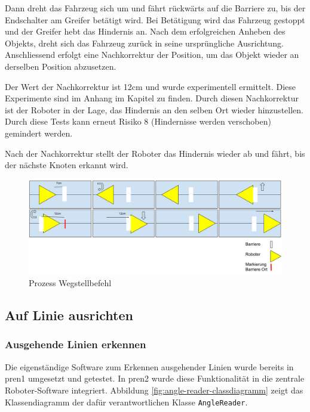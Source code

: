 Dann dreht das Fahrzeug sich um und fährt rückwärts auf die Barriere zu, bis der Endschalter am Greifer betätigt wird. Bei Betätigung wird das Fahrzeug gestoppt und der Greifer hebt das Hindernis an.
Nach dem erfolgreichen Anheben des Objekts, dreht sich das Fahrzeug zurück in seine ursprüngliche Ausrichtung. Anschliessend erfolgt eine Nachkorrektur der Position, um das Objekt wieder an derselben Position abzusetzen.

Der Wert der Nachkorrektur ist 12cm und wurde experimentell ermittelt. Diese Experimente sind im Anhang im Kapitel  zu finden. Durch diesen Nachkorrektur ist der Roboter in der Lage, das Hindernis an den selben Ort wieder hinzustellen. Durch diese Tests kann erneut Risiko 8 (Hindernisse werden verschoben) gemindert werden.

Nach der Nachkorrektur stellt der Roboter das Hindernis wieder ab und fährt, bis der nächste Knoten erkannt wird.

\begin{figure}[H]
    \centering
    \includegraphics[width=\linewidth]{assets/ET/wegstellbefehl.png}
    \caption{Prozess Wegstellbefehl}
    \label{fig:wegstellbefehl}
\end{figure}


\newpage
\subsection{Auf Linie ausrichten}



\subsubsection{Ausgehende Linien erkennen}
\label{outgoing-lines}

Die eigenständige Software zum Erkennen ausgehender Linien wurde bereits in \acrshort{pren1} umgesetzt und getestet. In \acrshort{pren2} wurde diese Funktionalität in die zentrale Roboter-Software integriert. Abbildung \ref{fig:angle-reader-classdiagramm} zeigt das Klassendiagramm der dafür verantwortlichen Klasse \verb|AngleReader|.

